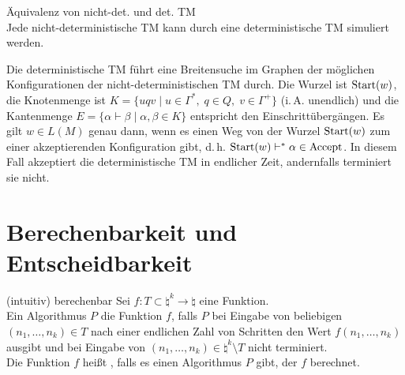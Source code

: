 \begin{Satz}{Äquivalenz von nicht-det. und det. TM}\\
    Jede nicht-deterministische TM kann durch eine deterministische TM simuliert werden.
\end{Satz}

\begin{Beweis}
    Die deterministische TM führt eine Breitensuche im Graphen der möglichen Konfigurationen
    der nicht-deterministischen TM durch.
    Die Wurzel ist $\text{Start}(w)$, die Knotenmenge ist
    $K = \{uqv \;|\; u \in \Gamma^\ast,\; q \in Q,\; v \in \Gamma^+\}$ (i.\,A. unendlich) und
    die Kantenmenge $E = \{\alpha \vdash \beta \;|\; \alpha, \beta \in K\}$ entspricht den
    Einschrittübergängen.
    Es gilt $w \in L(M)$ genau dann, wenn es einen Weg von der Wurzel $\text{Start}(w)$
    zum einer akzeptierenden Konfiguration gibt, d.\,h. $\text{Start}(w) \vdash^\ast \alpha \in \text{Accept}$.
    In diesem Fall akzeptiert die deterministische TM in endlicher Zeit, andernfalls terminiert
    sie nicht.
\end{Beweis}

\pagebreak

\section{%
    Berechenbarkeit und Entscheidbarkeit%
}

\begin{Def}{(intuitiv) berechenbar}
    Sei $f\colon T \subset \natural^k \rightarrow \natural$ eine Funktion.\\
    Ein Algorithmus $P$  die Funktion $f$, falls $P$ bei Eingabe von beliebigen
    $(n_1, \dotsc, n_k) \in T$ nach einer endlichen Zahl von Schritten
    den Wert $f(n_1, \dotsc, n_k)$ ausgibt und bei Eingabe von
    $(n_1, \dotsc, n_k) \in \natural^k \setminus T$ nicht terminiert.\\
    Die Funktion $f$ heißt , falls es einen Algorithmus $P$ gibt, der $f$
    berechnet.
\end{Def}


